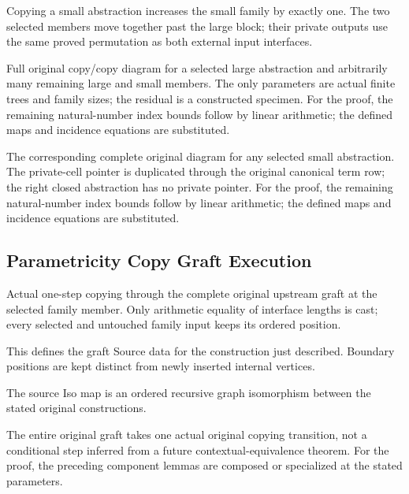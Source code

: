 Copying a small abstraction increases the small family by exactly one. The two selected members move together past the large block; their private outputs use the same proved permutation as both external input interfaces.
\par{}

Full original copy/copy diagram for a selected large abstraction and arbitrarily many remaining large and small members. The only parameters are actual finite trees and family sizes; the residual is a constructed specimen.
For the proof, the remaining natural-number index bounds follow by linear arithmetic; the defined maps and incidence equations are substituted.
\par{}

The corresponding complete original diagram for any selected small abstraction. The private-cell pointer is duplicated through the original canonical term row; the right closed abstraction has no private pointer.
For the proof, the remaining natural-number index bounds follow by linear arithmetic; the defined maps and incidence equations are substituted.
\par{}

\subsection{Parametricity Copy Graft Execution}
Actual one-step copying through the complete original upstream graft at the selected family member. Only arithmetic equality of interface lengths is cast; every selected and untouched family input keeps its ordered position.

This defines the graft Source data for the construction just described. Boundary positions are kept distinct from newly inserted internal vertices.
\par{}

The source Iso map is an ordered recursive graph isomorphism between the stated original constructions.
\par{}

The entire original graft takes one actual original copying transition, not a conditional step inferred from a future contextual-equivalence theorem.
For the proof, the preceding component lemmas are composed or specialized at the stated parameters.
\par{}

